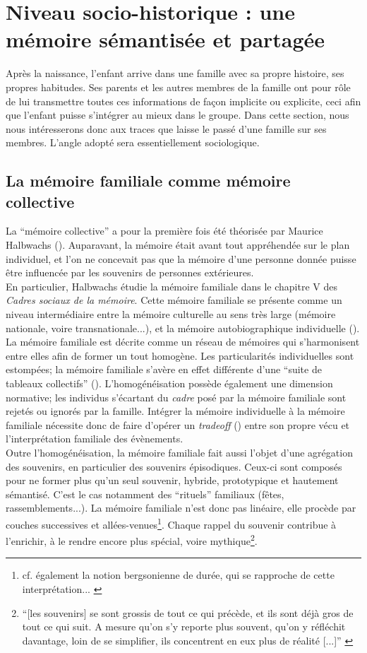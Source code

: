 \documentclass[french]{article}
\begin{document}
		\section{Niveau socio-historique : une mémoire sémantisée et partagée}\label{socio}
			Après la naissance, l'enfant arrive dans une famille avec sa propre histoire, ses propres habitudes. Ses parents et les autres membres de la famille ont pour rôle de lui transmettre toutes ces informations de façon implicite ou explicite, ceci afin que l'enfant puisse s'intégrer au mieux dans le groupe. Dans cette section, nous nous intéresserons donc aux traces que laisse le passé d'une famille sur ses membres. L'angle adopté sera essentiellement sociologique.
		
		\subsection{La mémoire familiale comme mémoire collective}\label{collec}
			La ``mémoire collective'' a pour la première fois été théorisée par Maurice Halbwachs (\cite{halbwachs1925,halbwachs1950}). Auparavant, la mémoire était avant tout appréhendée sur le plan individuel, et l'on ne concevait pas que la mémoire d'une personne donnée puisse être influencée par les souvenirs de personnes extérieures.\\
			En particulier, Halbwachs étudie la mémoire familiale dans le chapitre V des \textit{Cadres sociaux de la mémoire}.  Cette mémoire familiale se présente comme un niveau intermédiaire entre la mémoire culturelle au sens très large (mémoire nationale, voire transnationale...), et la mémoire autobiographique individuelle (\cite{boesen2012}). La mémoire familiale est décrite comme un réseau de mémoires qui s'harmonisent entre elles afin de former un tout homogène. Les particularités individuelles sont estompées; la mémoire familiale s'avère en effet différente d'une ``suite de tableaux collectifs'' (\cite[p.~110]{halbwachs1925}). L'homogénéisation possède également une dimension normative; les individus s'écartant du \textit{cadre} posé par la  mémoire familiale sont rejetés ou ignorés par la famille. Intégrer la mémoire individuelle à la mémoire familiale nécessite donc de faire d'opérer un \textit{tradeoff} (\cite{muxel2012}) entre son propre vécu et l'interprétation familiale des évènements.\\
			Outre l'homogénéisation, la mémoire familiale fait aussi l'objet d'une agrégation des souvenirs, en particulier des souvenirs épisodiques. Ceux-ci sont composés pour ne former plus qu'un seul souvenir, hybride, prototypique et hautement sémantisé. C'est le cas notamment des ``rituels'' familiaux (fêtes, rassemblements...). La mémoire familiale n'est donc pas linéaire, elle procède par couches successives et allées-venues\footnote{cf. également la notion bergsonienne de durée, qui se rapproche de cette interprétation... \cite[p.~5]{bergson1908}}. Chaque rappel du souvenir contribue à l'enrichir, à le rendre encore plus spécial, voire mythique\footnote{``[les souvenirs] se sont grossis de tout ce qui précède, et ils sont déjà gros de tout ce qui suit. A mesure qu'on s'y reporte plus souvent, qu'on y réfléchit davantage, loin de se simplifier, ils concentrent en eux plus de réalité [...]'' \cite[p.~114]{halbwachs1925}}.
\end{document}
